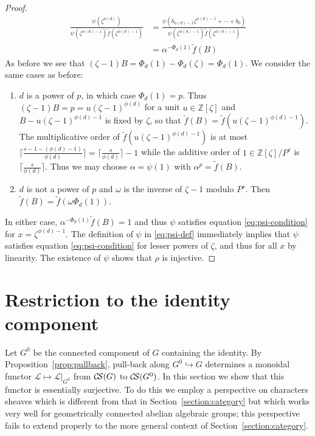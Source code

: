 \documentclass[11pt]{amsart}
\theoremstyle{plain}
\theoremstyle{definition}
\theoremstyle{remark}
\newcommand{\ZZ}{{\mathbb{Z}}}
\newcommand{\cs}[1]{{\mathcal{#1}}}
\newcommand{\CS}{{\mathcal{C\hskip-1.8pt S}}}
\begin{document}
\begin{proof}
\begin{align*}
\frac{\psi(\zeta^{\phi(d)})}{\psi(\zeta^{\phi(d)-1})\tilde{f}(\zeta^{\phi(d)-1})} &= \frac{\psi(b_{\phi(d)-1}\zeta^{\phi(d)-1} + \cdots + b_0)}{\psi(\zeta^{\phi(d)-1})\tilde{f}(\zeta^{\phi(d)-1})} \\
&= \alpha^{-\Phi_d(1)} \tilde{f}(B)
\end{align*}
As before we see that $(\zeta - 1)B = \Phi_d(1) - \Phi_d(\zeta) = \Phi_d(1)$.  We consider the same cases as before:

\begin{enumerate}
\item $d$ is a power of $p$, in which case $\Phi_d(1) = p$.  Thus $(\zeta-1)B = p = u(\zeta-1)^{\phi(d)}$ for a unit $u \in \ZZ[\zeta]$ and $B - u(\zeta-1)^{\phi(d)-1}$ is fixed by $\zeta$, so that $\tilde{f}(B) = \tilde{f}(u(\zeta - 1)^{\phi(d)-1})$.  The multiplicative order of $\tilde{f}(u(\zeta-1)^{\phi(d)-1})$ is at most $\lceil \frac{s - 1 - (\phi(d)-1)}{\phi(d)}\rceil = \lceil \frac{s}{\phi(d)} \rceil - 1$ while the additive order of $1 \in \ZZ[\zeta]/P^s$ is $\lceil \frac{s}{\phi(d)} \rceil$.  Thus we may choose $\alpha = \psi(1)$ with $\alpha^p = \tilde{f}(B)$.
\item $d$ is not a power of $p$ and $\omega$ is the inverse of $\zeta-1$ modulo $P^s$.  Then $\tilde{f}(B) = \tilde{f}(\omega\Phi_d(1))$.
\end{enumerate}
In either case, $\alpha^{-\Phi_d(1)}\tilde{f}(B) = 1$ and thus $\psi$ satisfies equation \ref{eq:psi-condition} for $x = \zeta^{\phi(d)-1}$.  The definition of $\psi$ in \ref{eq:psi-def} immediately implies that $\psi$ satisfies equation \ref{eq:psi-condition} for lesser powers of $\zeta$, and thus for all $x$ by linearity.  The existence of $\psi$ shows that $\rho$ is injective.
\end{proof}

\section{Restriction to the identity component}

%
Let $G^0$ be the connected component of $G$ containing the identity. 
By Proposition~\ref{prop:pullback}, pull-back along $G^0\hookrightarrow G$ determines a monoidal functor $\cs{L}\mapsto \cs{L}\vert_{G^0}$ from $\CS(G)$ to $\CS(G^0)$.  In this section we show that this functor is essentially surjective. To do this we employ a perspective on characters sheaves which is different from that in Section~\ref{section:category} but which works very well for geometrically connected abelian algebraic groups; this perspective fails to extend properly to the more general context of Section~\ref{section:category}.
\end{document}
